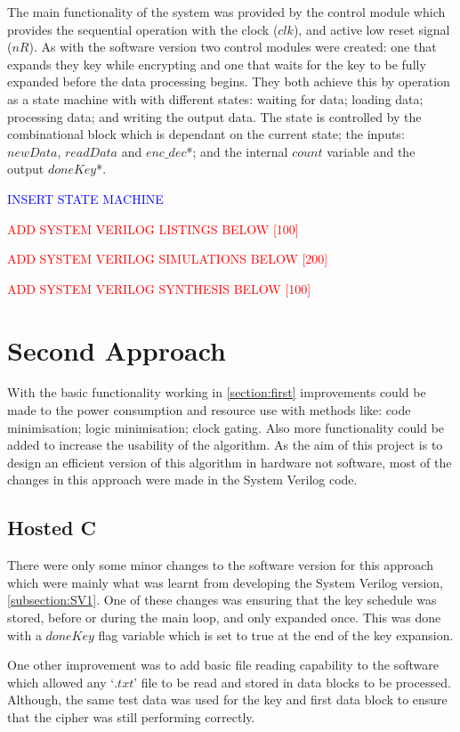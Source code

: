\documentclass[12pt,twoside,a4paper]{report}
\begin{document}
	The main functionality of the system was provided by the control module which provides the sequential operation with the clock ($clk$), and active low reset signal ($nR$). As with the software version two control modules were created: one that expands they key while encrypting and one that waits for the key to be fully expanded before the data processing begins. They both achieve this by operation as a state machine with with different states: waiting for data; loading data; processing data; and writing the output data. The state is controlled by the combinational block which is dependant on the current state; the inputs: $newData$, $readData$ and $enc\_dec$*; and the internal $count$ variable and the output $doneKey$*.
	
	\textcolor{blue}{INSERT STATE MACHINE}
    
	\textcolor{red}{ADD SYSTEM VERILOG LISTINGS BELOW [100]}
    
	\textcolor{red}{ADD SYSTEM VERILOG SIMULATIONS BELOW [200]}
    
	\textcolor{red}{ADD SYSTEM VERILOG SYNTHESIS BELOW [100]}
    
	\section{Second Approach}
	\label{section:second}
	With the basic functionality working in \autoref{section:first} improvements could be made to the power consumption and resource use with methods like: code minimisation; logic minimisation; clock gating. Also more functionality could be added to increase the usability of the algorithm. As the aim of this project is to design an efficient version of this algorithm in hardware not software, most of the changes in this approach were made in the System Verilog code.
    
	\subsection{Hosted C}
	\label{subsection:HOSTED2}
	
	There were only some minor changes to the software version for this approach which were mainly what was learnt from developing the System Verilog version, \autoref{subsection:SV1}. One of these changes was ensuring that the key schedule was stored, before or during the main loop, and only expanded once. This was done with a $doneKey$ flag variable which is set to true at the end of the key expansion.
	
	One other improvement was to add basic file reading capability to the software which allowed any  `$.txt$' file to be read and stored in data blocks to be processed. Although, the same test data was used for the key and first data block to ensure that the cipher was still performing correctly.
    
\end{document}

